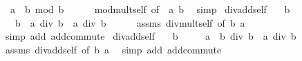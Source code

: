 \begin{isabellebody}
\ \ {\isachardoublequoteopen}a\ {\isacharasterisk}{\kern0pt}\ b\ mod\ b\ {\isacharequal}{\kern0pt}\ {}{\isachardoublequoteclose}\isanewline
%
\isadelimproof
\ \ %
\endisadelimproof
%
\isatagproof
{}\isamarkupfalse%
\ mod{\isacharunderscore}{\kern0pt}mult{\isacharunderscore}{\kern0pt}self{}\ {\isacharbrackleft}{\kern0pt}of\ {}\ a\ b{\isacharbrackright}{\kern0pt}\ \isamarkupfalse%
\ simp%
\endisatagproof
{\isafoldproof}%
%
\isadelimproof
\isanewline
%
\endisadelimproof
\isanewline
{}\isamarkupfalse%
\ div{\isacharunderscore}{\kern0pt}add{\isacharunderscore}{\kern0pt}self{}{\isacharcolon}{\kern0pt}\isanewline
\ \ \ {\isachardoublequoteopen}b\ {\isasymnoteq}\ {}{\isachardoublequoteclose}\isanewline
\ \ \ {\isachardoublequoteopen}{\isacharparenleft}{\kern0pt}b\ {\isacharplus}{\kern0pt}\ a{\isacharparenright}{\kern0pt}\ div\ b\ {\isacharequal}{\kern0pt}\ a\ div\ b\ {\isacharplus}{\kern0pt}\ {}{\isachardoublequoteclose}\isanewline
%
\isadelimproof
\ \ %
\endisadelimproof
%
\isatagproof
{}\isamarkupfalse%
\ assms\ div{\isacharunderscore}{\kern0pt}mult{\isacharunderscore}{\kern0pt}self{}\ {\isacharbrackleft}{\kern0pt}of\ b\ a\ {}{\isacharbrackright}{\kern0pt}\ \isamarkupfalse%
\ {\isacharparenleft}{\kern0pt}simp\ add{\isacharcolon}{\kern0pt}\ add{\isachardot}{\kern0pt}commute{\isacharparenright}{\kern0pt}%
\endisatagproof
{\isafoldproof}%
%
\isadelimproof
\isanewline
%
\endisadelimproof
\isanewline
{}\isamarkupfalse%
\ div{\isacharunderscore}{\kern0pt}add{\isacharunderscore}{\kern0pt}self{}{\isacharcolon}{\kern0pt}\isanewline
\ \ \ {\isachardoublequoteopen}b\ {\isasymnoteq}\ {}{\isachardoublequoteclose}\isanewline
\ \ \ {\isachardoublequoteopen}{\isacharparenleft}{\kern0pt}a\ {\isacharplus}{\kern0pt}\ b{\isacharparenright}{\kern0pt}\ div\ b\ {\isacharequal}{\kern0pt}\ a\ div\ b\ {\isacharplus}{\kern0pt}\ {}{\isachardoublequoteclose}\isanewline
%
\isadelimproof
\ \ %
\endisadelimproof
%
\isatagproof
{}\isamarkupfalse%
\ assms\ div{\isacharunderscore}{\kern0pt}add{\isacharunderscore}{\kern0pt}self{}\ {\isacharbrackleft}{\kern0pt}of\ b\ a{\isacharbrackright}{\kern0pt}\ \isamarkupfalse%
\ {\isacharparenleft}{\kern0pt}simp\ add{\isacharcolon}{\kern0pt}\ add{\isachardot}{\kern0pt}commute{\isacharparenright}{\kern0pt}%
\endisatagproof

\end{isabellebody}
